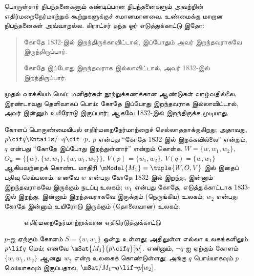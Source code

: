 \documentclass[../../../include/open-logic-section]{subfiles}
\begin{document}


பொருள்சார் நிபந்தனைகளும் கண்டிப்பான நிபந்தனைகளும் அவற்றின்
எதிர்மறைநேர்மாற்றுக் கூற்றுகளுக்குச் சமானமானவை. உண்மைக்கு மாறான
நிபந்தனைகள் அவ்வாறல்ல. கிராட்சர் தந்த ஓர் எடுத்துக்காட்டு இதோ:
\begin{quote}
  கோதே 1832-இல் இறந்திருக்காவிட்டால், இப்போதும் அவர் இறந்தவராகவே
  இருந்திருப்பார்.

  கோதே இப்போது இறந்தவராக இல்லாவிட்டால், அவர் 1832-இல் இறந்திருப்பார்.
\end{quote}
முதல் வாக்கியம் மெய்: மனிதர்கள் நூற்றுக்கணக்கான ஆண்டுகள் வாழ்வதில்லை.
இரண்டாவது தெளிவாகப் பொய்: கோதே இப்போது இறந்தவராக இல்லாவிட்டால், அவர்
இன்னும் உயிரோடு இருப்பார்; ஆகவே 1832-இல் இறந்திருக்க முடியாது.

\begin{ex}
  கோளப் பொருண்மையியல் எதிர்மறைநேர்மாற்றைச் செல்லாததாக்குகிறது; அதாவது,
  $p \cif q \Entails/ \lnot q \cif \lnot p$. $p$ என்பது ``கோதே
  1832-இல் இறக்கவில்லை'' என்றும், $q$ என்பது ``கோதே இப்போது இறந்துள்ளார்''
  என்றும் கொள்க. $W = \{w, w_1, w_2\}$, $O_w = \{\{w\}, \{w, w_1\},
  \{w, w_1, w_2\}\}$, $V(p) = \{w_1, w_2\}$, $V(q) = \{w, w_1\}$
  ஆகியவற்றைக் கொண்ட மாதிரி $\mModel{M_1} = \tuple{W, O, V}$ இல் இதைப்
  பதிவு செய்யலாம்.
  எனவே $w$ என்பது கோதே 1832-இல் இறந்து, இன்னும் இறந்தவராகவே இருக்கும்
  நடப்பு உலகம்; $w_1$ என்பது கோதே, எடுத்துக்காட்டாக 1833-இல் இறந்து,
  இன்னும் இறந்தவராகவே இருக்கும் (நெருங்கிய) உலகம்; $w_2$ என்பது கோதே
  இன்னும் உயிரோடு இருக்கும் (தொலைவான) உலகம்.
\begin{figure}
\begin{center}
\caption{எதிர்மறைநேர்மாற்றுக்கான எதிரெடுத்துக்காட்டு}
\end{center}
\end{figure}
$p$-ஐ ஏற்கும் கோளம் $S = \{w, w_1\}$ ஒன்று உள்ளது; அதிலுள்ள எல்லா
உலகங்களிலும் $p \lif q$ மெய்; எனவே $\mSat{M_1}{p \cif q}[w]$.
எனினும், $\lnot q$-ஐ ஏற்கும் கோளம் $\{w, w_1, w_2\}$ ஆனது~$w_2$ என்ற
உலகைக் கொண்டுள்ளது; அங்கு $q$ பொய்யாகவும் $p$ மெய்யாகவும் இருப்பதால்,
$\mSat/{M_1}{\lnot q \lif \lnot p}[w_2]$.
\end{ex}
\end{document}
